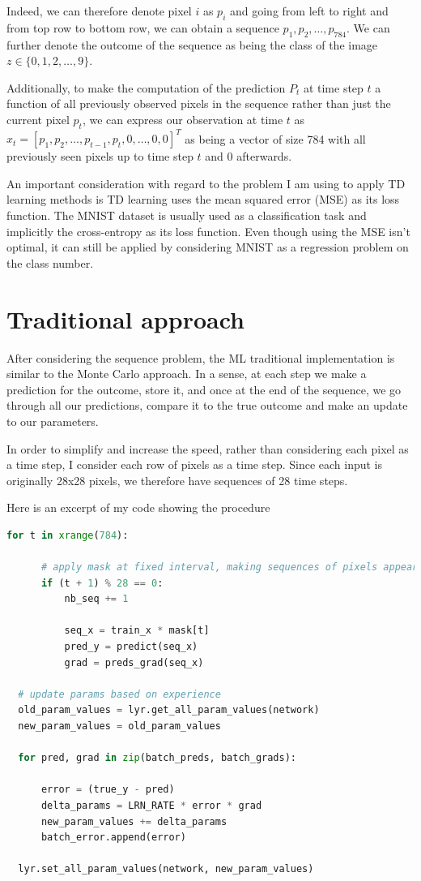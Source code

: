 \documentclass{article}
\begin{document}
Indeed, we can therefore denote pixel $i$ as $p_i$ and going from left to right and from top row to bottom row, we can obtain a sequence $p_1, p_2, \dots, p_{784}$. We can further denote the outcome of the sequence as being the class of the image $z \in \{ 0, 1, 2, \dots, 9 \}$.

Additionally, to make the computation of the prediction $P_t$ at time step $t$ a function of all previously observed pixels in the sequence rather than just the current pixel $p_t$, we can express our observation at time $t$ as $x_t = [p_1, p_2, \dots, p_{t-1}, p_t, 0, \dots, 0, 0]^T$ as being a vector of size 784 with all previously seen pixels up to time step $t$ and 0 afterwards.

An important consideration with regard to the problem I am using to apply TD learning methods is TD learning uses the mean squared error (MSE) as its loss function. The MNIST dataset is usually used as a classification task and implicitly the cross-entropy as its loss function. Even though using the MSE isn't optimal, it can still be applied by considering MNIST as a regression problem on the class number.


\section{Traditional approach}

After considering the sequence problem, the ML traditional implementation is similar to the Monte Carlo approach. In a sense, at each step we make a prediction for the outcome, store it, and once at the end of the sequence, we go through all our predictions, compare it to the true outcome and make an update to our parameters.

In order to simplify and increase the speed, rather than considering each pixel as a time step, I consider each row of pixels as a time step. Since each input is originally 28x28 pixels, we therefore have sequences of 28 time steps.

\pagebreak

Here is an excerpt of my code showing the procedure

\begin{lstlisting}[language=Python]
  for t in xrange(784):

      # apply mask at fixed interval, making sequences of pixels appear
      if (t + 1) % 28 == 0:
          nb_seq += 1

          seq_x = train_x * mask[t]
          pred_y = predict(seq_x)
          grad = preds_grad(seq_x)

  # update params based on experience
  old_param_values = lyr.get_all_param_values(network)
  new_param_values = old_param_values

  for pred, grad in zip(batch_preds, batch_grads):

      error = (true_y - pred)
      delta_params = LRN_RATE * error * grad
      new_param_values += delta_params
      batch_error.append(error)

  lyr.set_all_param_values(network, new_param_values)
\end{lstlisting}
\end{document}

